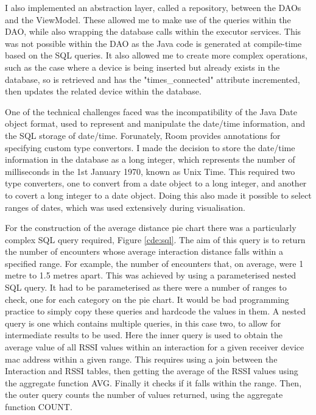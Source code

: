 \documentclass{l4proj}
\begin{document}
I also implemented an abstraction layer, called a repository, between the DAOs and the ViewModel. These allowed me to make use of the queries within the DAO, while also wrapping the database calls within the executor services. This was not possible within the DAO as the Java code is generated at compile-time based on the SQL queries. It also allowed me to create more complex operations, such as the case where a device is being inserted but already exists in the database, so is retrieved and has the "times\_connected" attribute incremented, then updates the related device within the database.

One of the technical challenges faced was the incompatibility of the Java Date object format, used to represent and manipulate the date/time information, and the SQL storage of date/time. Forunately, Room provides annotations for specifying custom type convertors. I made the decision to store the date/time information in the database as a long integer, which represents the number of milliseconds in the 1st January 1970, known as Unix Time. This required two type converters, one to convert from a date object to a long integer, and another to covert a long integer to a date object. Doing this also made it possible to select ranges of dates, which was used extensively during visualisation.

For the construction of the average distance pie chart there was a particularly complex SQL query required, Figure \ref{cde:sql}. The aim of this query is to return the number of encounters whose average interaction distance falls within a specified range. For example, the number of encounters that, on average, were 1 metre to 1.5 metres apart. This was achieved by using a parameterised nested SQL query. It had to be parameterised as there were a number of ranges to check, one for each category on the pie chart. It would be bad programming practice to simply copy these queries and hardcode the values in them. A nested query is one which contains multiple queries, in this case two, to allow for intermediate results to be used. Here the inner query is used to obtain the average value of all RSSI values within an interaction for a given receiver device mac address within a given range. This requires using a join between the Interaction and RSSI tables, then getting the average of the RSSI values using the aggregate function AVG. Finally it checks if it falls within the range. Then, the outer query counts the number of values returned, using the aggregate function COUNT.
\end{document}
